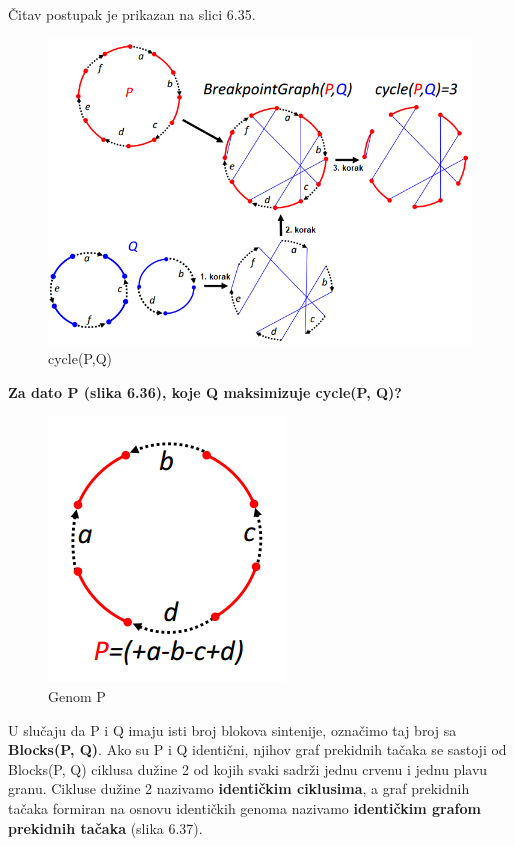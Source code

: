 Čitav postupak je prikazan na slici 6.35.\\

\begin{figure}[h!]
\centering
\includegraphics[scale=0.55]{poglavlja/6/slike/cycle.PNG}
\caption{cycle(P,Q)}
\label{slika:X}
\end{figure}
\newpage
\noindent \textbf{ Za dato P (slika 6.36), koje Q maksimizuje cycle(P, Q)?}\\

\begin{figure}[h!]
\centering
\includegraphics[scale=0.7]{poglavlja/6/slike/Pabcd.PNG}
\caption{Genom P}
\label{slika:X}
\end{figure}

U slučaju da P i Q imaju isti broj blokova sintenije, označimo taj broj sa \textbf{Blocks(P, Q)}. Ako su P i Q identični, njihov graf prekidnih tačaka se sastoji od Blocks(P, Q) ciklusa dužine 2 od kojih svaki sadrži jednu crvenu i jednu plavu granu. Cikluse dužine 2 nazivamo \textbf{identičkim ciklusima}, a graf prekidnih tačaka formiran na osnovu identičkih genoma nazivamo \textbf{identičkim grafom prekidnih tačaka} (slika 6.37).

